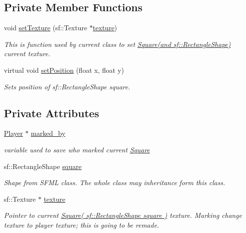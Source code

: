 \subsection*{Private Member Functions}
\begin{DoxyCompactItemize}
\item 
void \hyperlink{class_square_ad62196a5af085b2cd38df1cc698226c8}{set\+Texture} (sf\+::\+Texture $\ast$\hyperlink{class_square_a9bd6a0eca56aa3075227f56ee54d7808}{texture})
\begin{DoxyCompactList}\small\item\em This is function used by current class to set \hyperlink{class_square}{Square(and sf\+::\+Rectangle\+Shape)} current texture. \end{DoxyCompactList}\item 
virtual void \hyperlink{class_square_a719a5dee91eaa87a7128061193388648}{set\+Position} (float x, float y)
\begin{DoxyCompactList}\small\item\em Sets position of sf\+::\+Rectangle\+Shape square. \end{DoxyCompactList}\end{DoxyCompactItemize}
\subsection*{Private Attributes}
\begin{DoxyCompactItemize}
\item 
\hyperlink{class_player}{Player} $\ast$ \hyperlink{class_square_a1304492dc99a6af1f0bf2ab24d97520a}{marked\+\_\+by}
\begin{DoxyCompactList}\small\item\em variable used to save who marked current \hyperlink{class_square}{Square} \end{DoxyCompactList}\item 
sf\+::\+Rectangle\+Shape \hyperlink{class_square_a973d093bc18730c9ad2e74f9866af996}{square}
\begin{DoxyCompactList}\small\item\em Shape from S\+F\+M\+L class. The whole class may inheritance form this class. \end{DoxyCompactList}\item 
sf\+::\+Texture $\ast$ \hyperlink{class_square_a9bd6a0eca56aa3075227f56ee54d7808}{texture}
\begin{DoxyCompactList}\small\item\em Pointer to current \hyperlink{class_square}{Square( sf\+::\+Rectangle\+Shape square )} texture. Marking change texture to player texture; this is going to be remade. \end{DoxyCompactList}\end{DoxyCompactItemize}
